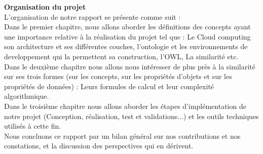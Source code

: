     \hspace{1.5cm} \textbf{ Organisation du projet }\\
    L’organisation de notre rapport se présente comme suit :\\Dans le premier chapitre, nous allons aborder les définitions des concepts ayant une importance relative à la réalisation du projet  tel que : Le Cloud computing son architecture et ses différentes couches, l’ontologie et les environnements de developpement qui la permettent sa construction, l'OWL, La similarité etc.\\
    Dans le deuxième chapitre  nous allons nous intéresser de plus près à la similarité sur ses trois formes (sur les concepts, sur les propriétés d'objets et sur les propriétés de données) : Leurs formules de calcul et leur complexité algorithmique.\\
    Dans le troisième chapitre  nous allons aborder les étapes d'implémentation de notre projet (Conception, réalisation, test et validations...) et les outils techniques utilisés à cette fin.\\
    Nous concluons ce rapport par un bilan général sur nos contributions et nos constations, et la discussion  des perspectives qui en dérivent.\
